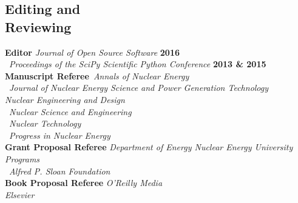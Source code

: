 \documentclass[margin,line]{resume}
\begin{document}
\begin{resume}
    \section{\mysidestyle Editing and\\Reviewing}
    \textbf{Editor} \hfill \emph{Journal of Open Source Software} \textbf{2016}\\%
                    \mbox{}~\hfill \emph{Proceedings of the SciPy Scientific Python Conference} \textbf{2013 \& 2015}\vspace{2mm}\\%
    \textbf{Manuscript Referee}~\hfill\emph{Annals of Nuclear Energy}\\%
                            \mbox{}~\hfill \emph{Journal of Nuclear Energy Science and Power Generation Technology} \\%
                            \mbox{}\hfill \emph{Nuclear Engineering and Design}\\%
                            \mbox{}~\hfill\emph{Nuclear Science and Engineering}\\%
                            \mbox{}~\hfill\emph{Nuclear Technology}\\%
                            \mbox{}~\hfill\emph{Progress in Nuclear Energy}\vspace{2mm}\\%
    \textbf{Grant Proposal Referee} \hfill \emph{Department of Energy Nuclear Energy University Programs}\\%
                            \mbox{}~\hfill\emph{Alfred P. Sloan Foundation}\vspace{2mm}\\%
    \textbf{Book Proposal Referee} \hfill\emph{O'Reilly Media}\\%
                            \mbox{}\hfill\emph{Elsevier}\vspace{2mm}\\%

\end{resume}
\end{document}
